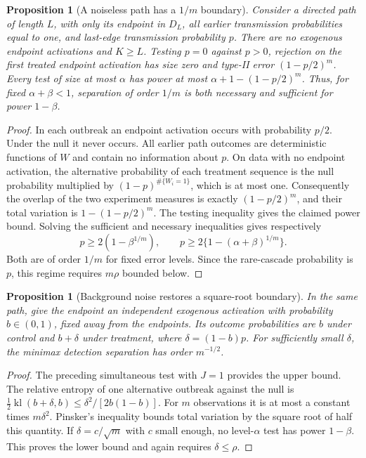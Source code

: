 \documentclass[11pt]{article}
\newtheorem{proposition}[theorem]{Proposition}
\theoremstyle{remark}
\begin{document}
\begin{proposition}[A noiseless path has a $1/m$ boundary]
Consider a directed path of length $L$, with only its endpoint in $D_L$, all earlier transmission probabilities equal to one, and last-edge transmission probability $p$. There are no exogenous endpoint activations and $K\ge L$. Testing $p=0$ against $p>0$, rejection on the first treated endpoint activation has size zero and type-II error $(1-p/2)^m$. Every test of size at most $\alpha$ has power at most
$\alpha+1-(1-p/2)^m$. Thus, for fixed $\alpha+\beta<1$, separation of order $1/m$ is both necessary and sufficient for power $1-\beta$.
\end{proposition}
\begin{proof}
In each outbreak an endpoint activation occurs with probability $p/2$. Under the null it never occurs. All earlier path outcomes are deterministic functions of $W$ and contain no information about $p$. On data with no endpoint activation, the alternative probability of each treatment sequence is the null probability multiplied by $(1-p)^{\#\{W_i=1\}}$, which is at most one. Consequently the overlap of the two experiment measures is exactly $(1-p/2)^m$, and their total variation is $1-(1-p/2)^m$. The testing inequality gives the claimed power bound. Solving the sufficient and necessary inequalities gives respectively
\[
 p\ge2(1-\beta^{1/m}),\qquad
 p\ge2\{1-(\alpha+\beta)^{1/m}\}.
\]
Both are of order $1/m$ for fixed error levels. Since the rare-cascade probability is $p$, this regime requires $m\rho$ bounded below.
\end{proof}

\begin{proposition}[Background noise restores a square-root boundary]
In the same path, give the endpoint an independent exogenous activation with probability $b\in(0,1)$, fixed away from the endpoints. Its outcome probabilities are $b$ under control and $b+\delta$ under treatment, where $\delta=(1-b)p$. For sufficiently small $\delta$, the minimax detection separation has order $m^{-1/2}$.
\end{proposition}
\begin{proof}
The preceding simultaneous test with $J=1$ provides the upper bound. The relative entropy of one alternative outbreak against the null is
$\frac12\operatorname{kl}(b+\delta,b)\le\delta^2/[2b(1-b)]$.
For $m$ observations it is at most a constant times $m\delta^2$. Pinsker's inequality bounds total variation by the square root of half this quantity. If $\delta=c/\sqrt m$ with $c$ small enough, no level-$\alpha$ test has power $1-\beta$. This proves the lower bound and again requires $\delta\le\rho$.
\end{proof}
\end{document}
